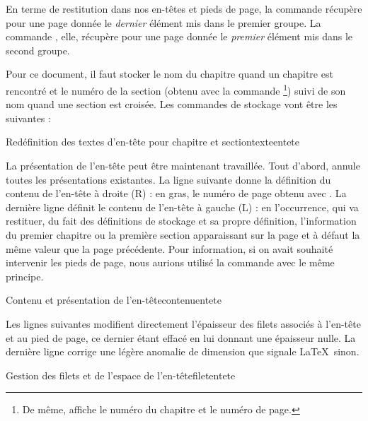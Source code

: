 En terme de restitution dans nos en-têtes et pieds de page, la  commande  récupère pour une page donnée le \emph{dernier} élément mis dans le premier groupe. La  commande , elle, récupère pour une page donnée le \emph{premier} élément mis dans le second groupe.

Pour ce document, il faut stocker le nom du chapitre quand un chapitre est rencontré et le numéro de la section (obtenu avec la  commande \footnote{De même,  affiche le numéro du chapitre et  le numéro de page.}) suivi de son nom quand une section est croisée. Les commandes de stockage vont être les suivantes :

\begin{codesimple}{Redéfinition des textes d'en-tête pour chapitre et section}{texteentete}
\renewcommand{\chaptermark}[1]{\markright{#1}}
\renewcommand{\sectionmark}[1]{\markright{\thesection\ #1}}
\end{codesimple}


La présentation de l'en-tête peut être maintenant travaillée. Tout d'abord,  annule toutes les présentations existantes. La ligne suivante donne la définition du contenu de l'en-tête à droite (R) : en gras, le numéro de page obtenu avec . La dernière ligne définit le contenu de l'en-tête à gauche (L) : en l'occurrence,  qui va restituer, du fait des définitions de stockage et sa propre définition, l'information du premier chapitre ou la première section apparaissant sur la page et à défaut la même valeur que la page précédente. 
Pour information, si on avait souhaité intervenir les pieds de page, nous aurions utilisé la  commande  avec le même principe. 

\begin{codesimple}{Contenu et présentation de l'en-tête}{contenuentete}
\fancyhf{}
\fancyhead[R]{\bfseries\thepage}
\fancyhead[L]{\bfseries\rightmark}
\end{codesimple}


Les lignes suivantes modifient directement l'épaisseur des filets associés à l'en-tête  et au pied de page, ce dernier étant effacé en lui donnant une épaisseur nulle. La dernière ligne corrige une légère anomalie de dimension que signale \LaTeX\ sinon.

\begin{codesimple}{Gestion des filets et de l'espace de l'en-tête}{filetentete}
\renewcommand{\headrulewidth}{0.5pt}
\renewcommand{\footrulewidth}{0pt}
\addtolenght{\headheight}{2pt}
\end{codesimple}


